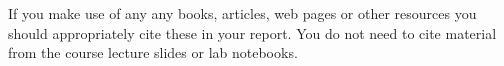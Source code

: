 \documentclass[11pt,]{article}
\begin{document}


If you make use of any any books, articles, web pages or other resources
you should appropriately cite these in your report. You do not need to
cite material from the course lecture slides or lab notebooks.



\end{document}
